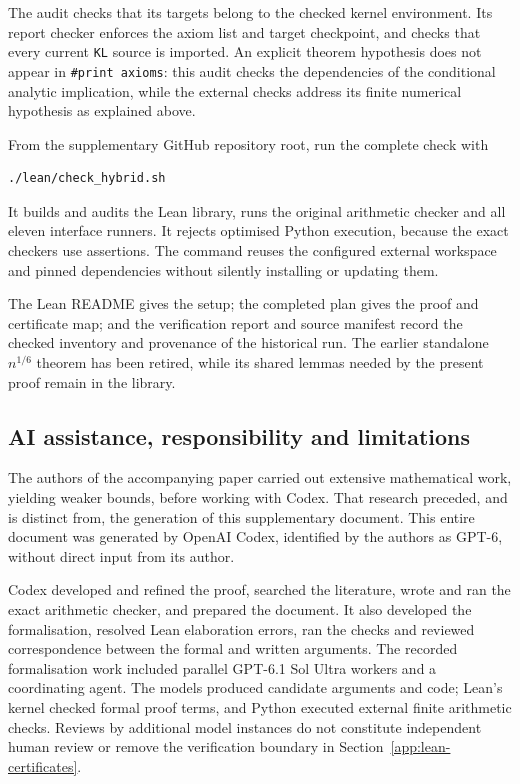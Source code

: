\documentclass[11pt,a4paper]{article}
\numberwithin{equation}{section}
\begin{document}
The audit checks that its targets belong to the checked kernel environment.
Its report checker enforces the axiom list and target checkpoint, and checks
that every current \texttt{KL} source is imported. An explicit theorem
hypothesis does not appear in \texttt{\#print axioms}: this audit checks the
dependencies of the conditional analytic implication, while the external
checks address its finite numerical hypothesis as explained above.

From the supplementary GitHub repository root, run the complete check with
\begin{verbatim}
./lean/check_hybrid.sh
\end{verbatim}
It builds and audits the Lean library, runs the original arithmetic checker
and all eleven interface runners. It rejects optimised Python execution,
because the exact checkers use assertions. The command reuses the
configured external workspace and pinned dependencies without silently
installing or updating them.

The Lean README gives the setup; the completed plan gives the proof and
certificate map; and the verification report and source manifest record the
checked inventory and provenance of the historical run. The earlier standalone
$n^{1/6}$ theorem has been retired, while its shared lemmas needed by the
present proof remain in the library.

\subsection{AI assistance, responsibility and limitations}
\label{app:lean-assistance}

The authors of the accompanying paper carried out extensive mathematical work,
yielding weaker bounds, before working with Codex. That research preceded,
and is distinct from, the generation of this supplementary document.
This entire document was generated by OpenAI Codex, identified by the authors
as GPT-6, without direct input from its author.

Codex developed and refined the proof, searched the literature, wrote and ran
the exact arithmetic checker, and prepared the document. It also developed
the formalisation, resolved Lean elaboration errors, ran the checks and
reviewed correspondence between the formal and written arguments. The recorded
formalisation work included parallel GPT-6.1 Sol Ultra workers and a
coordinating agent. The models produced candidate arguments and code;
Lean's kernel checked formal proof terms, and Python executed external finite
arithmetic checks. Reviews by additional model instances do not constitute
independent human review or remove the verification boundary in
Section~\ref{app:lean-certificates}.
\end{document}
